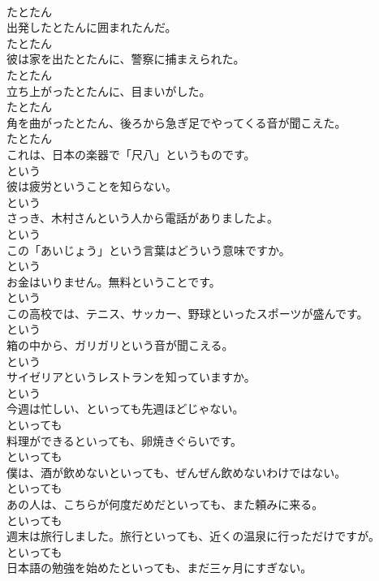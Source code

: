 \documentclass[8pt]{extreport}
\begin{document}
\begin{CJK}{UTF8}{min}
\\	たとたん	
\\	出発したとたんに囲まれたんだ。	
\\	たとたん	
\\	彼は家を出たとたんに、警察に捕まえられた。	
\\	たとたん	
\\	立ち上がったとたんに、目まいがした。	
\\	たとたん	
\\	角を曲がったとたん、後ろから急ぎ足でやってくる音が聞こえた。	
\\	たとたん	
\\	これは、日本の楽器で「尺八」というものです。	
\\	という	
\\	彼は疲労ということを知らない。	
\\	という	
\\	さっき、木村さんという人から電話がありましたよ。	
\\	という	
\\	この「あいじょう」という言葉はどういう意味ですか。	
\\	という	
\\	お金はいりません。無料ということです。	
\\	という	
\\	この高校では、テニス、サッカー、野球といったスポーツが盛んです。	
\\	という	
\\	箱の中から、ガリガリという音が聞こえる。	
\\	という	
\\	サイゼリアというレストランを知っていますか。	
\\	という	
\\	今週は忙しい、といっても先週ほどじゃない。	
\\	といっても	
\\	料理ができるといっても、卵焼きぐらいです。	
\\	といっても	
\\	僕は、酒が飲めないといっても、ぜんぜん飲めないわけではない。	
\\	といっても	
\\	あの人は、こちらが何度だめだといっても、また頼みに来る。	
\\	といっても	
\\	週末は旅行しました。旅行といっても、近くの温泉に行っただけですが。	
\\	といっても	
\\	日本語の勉強を始めたといっても、まだ三ヶ月にすぎない。	

\end{CJK}
\end{document}
